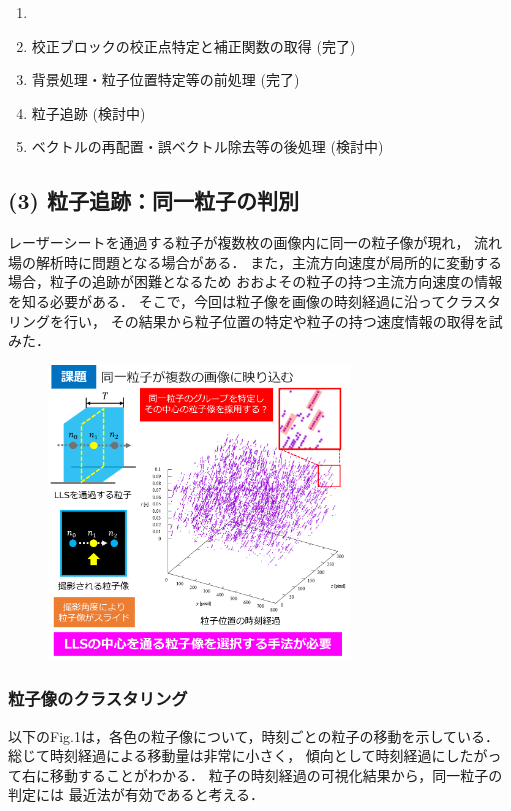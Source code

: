 \documentclass[twocolumn,a4j]{jsarticle}
\begin{document}
\begin{enumerate}[(1)]
	\item [] \textgt{[ 全体の流れ ]}
	\item 校正ブロックの校正点特定と補正関数の取得 (完了)
	\item 背景処理・粒子位置特定等の前処理 (完了)
	\item 粒子追跡 (検討中)
	\item ベクトルの再配置・誤ベクトル除去等の後処理 (検討中)
\end{enumerate}

\newpage
\subsection{(3) 粒子追跡：同一粒子の判別}
レーザーシートを通過する粒子が複数枚の画像内に同一の粒子像が現れ，
流れ場の解析時に問題となる場合がある．
また，主流方向速度が局所的に変動する場合，粒子の追跡が困難となるため
おおよその粒子の持つ主流方向速度の情報を知る必要がある．
そこで，今回は粒子像を画像の時刻経過に沿ってクラスタリングを行い，
その結果から粒子位置の特定や粒子の持つ速度情報の取得を試みた．

\begin{figure}[htbp]
	\includegraphics[keepaspectratio, width=80mm]{../images/challenge.png}
\end{figure}

\subsubsection*{粒子像のクラスタリング}
以下のFig.1は，各色の粒子像について，時刻ごとの粒子の移動を示している．
総じて時刻経過による移動量は非常に小さく，
傾向として時刻経過にしたがって右に移動することがわかる．
粒子の時刻経過の可視化結果から，同一粒子の判定には
最近法が有効であると考える．
\end{document}
